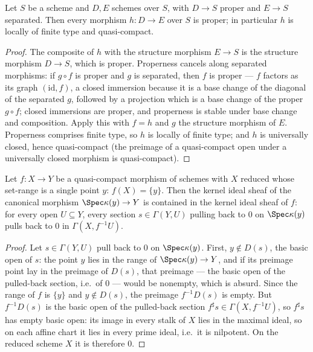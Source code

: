 \begin{theorem}
  \label{thm:overHom_isProper}
  \leanok
  Let \(S\) be a scheme and \(D, E\) schemes over \(S\), with \(D \to S\) proper and
  \(E \to S\) separated. Then every morphism \(h : D \to E\) over \(S\) is proper; in
  particular \(h\) is locally of finite type and quasi-compact.
\end{theorem}
\begin{proof}
  \leanok
  The composite of \(h\) with the structure morphism \(E \to S\) is the structure
  morphism \(D \to S\), which is proper. Properness cancels along separated morphisms:
  if \(g \circ f\) is proper and \(g\) is separated, then \(f\) is proper --- \(f\)
  factors as its graph \((\mathrm{id}, f)\), a closed immersion because it is a base
  change of the diagonal of the separated \(g\), followed by a projection which is a
  base change of the proper \(g \circ f\); closed immersions are proper, and properness
  is stable under base change and composition. Apply this with \(f = h\) and \(g\) the
  structure morphism of \(E\). Properness comprises finite type, so \(h\) is locally of
  finite type; and \(h\) is universally closed, hence quasi-compact (the preimage of a
  quasi-compact open under a universally closed morphism is quasi-compact).
\end{proof}

\begin{lemma}
  \label{lem:ker_fromSpecResidueField_le}
  \leanok
  Let \(f : X \to Y\) be a quasi-compact morphism of schemes with \(X\) reduced whose
  set-range is a single point \(y\): \(f(X) = \{y\}\). Then the kernel ideal sheaf of
  the canonical morphism \(\Spec \kappa(y) \to Y\) is contained in the kernel ideal
  sheaf of \(f\): for every open \(U \subseteq Y\), every section \(s \in \Gamma(Y, U)\)
  pulling back to \(0\) on \(\Spec \kappa(y)\) pulls back to \(0\) in
  \(\Gamma(X, f^{-1}U)\).
\end{lemma}
\begin{proof}
  \leanok
  Let \(s \in \Gamma(Y, U)\) pull back to \(0\) on \(\Spec \kappa(y)\). First,
  \(y \notin D(s)\), the basic open of \(s\): the point \(y\) lies in the range of
  \(\Spec \kappa(y) \to Y\), and if its preimage point lay in the preimage of \(D(s)\),
  that preimage --- the basic open of the pulled-back section, i.e.\ of \(0\) --- would
  be nonempty, which is absurd. Since the range of \(f\) is \(\{y\}\) and \(y \notin
  D(s)\), the preimage \(f^{-1}D(s)\) is empty. But \(f^{-1}D(s)\) is the basic open of
  the pulled-back section \(f^{\sharp}s \in \Gamma(X, f^{-1}U)\), so \(f^{\sharp}s\)
  has empty basic open: its image in every stalk of \(X\) lies in the maximal ideal, so
  on each affine chart it lies in every prime ideal, i.e.\ it is nilpotent. On the
  reduced scheme \(X\) it is therefore \(0\).
\end{proof}

